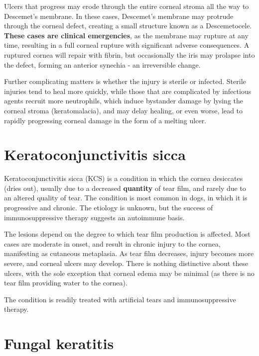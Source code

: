 \documentclass[openany]{book}
\begin{document}
Ulcers that progress may erode through the entire corneal stroma all the
way to Descemet's membrane. In these cases, Descemet's membrane may
protrude through the corneal defect, creating a small structure known as
a Descemetocele. \textbf{These cases are clinical emergencies}, as the
membrane may rupture at any time, resulting in a full corneal rupture
with significant adverse consequences. A ruptured cornea will repair
with fibrin, but occasionally the iris may prolapse into the defect,
forming an anterior synechia - an irreversible change.

Further complicating matters is whether the injury is sterile or
infected. Sterile injuries tend to heal more quickly, while those that
are complicated by infectious agents recruit more neutrophils, which
induce bystander damage by lysing the corneal stroma (keratomalacia),
and may delay healing, or even worse, lead to rapidly progressing
corneal damage in the form of a melting ulcer.

\section{Keratoconjunctivitis sicca}\label{keratoconjunctivitis-sicca}

Keratoconjunctivitis sicca (KCS) is a condition in which the cornea
desiccates (dries out), usually due to a decreased \textbf{quantity} of
tear film, and rarely due to an altered quality of tear. The condition
is most common in dogs, in which it is progressive and chronic. The
etiology is unknown, but the success of immunosuppressive therapy
suggests an autoimmune basis.

The lesions depend on the degree to which tear film production is
affected. Most cases are moderate in onset, and result in chronic injury
to the cornea, manifesting as cutaneous metaplasia. As tear film
decreases, injury becomes more severe, and corneal ulcers may develop.
There is nothing distinctive about these ulcers, with the sole exception
that corneal edema may be minimal (as there is no tear film providing
water to the cornea).

The condition is readily treated with artificial tears and
immunosuppressive therapy.

\section{Fungal keratitis}\label{fungal-keratitis}
\end{document}
